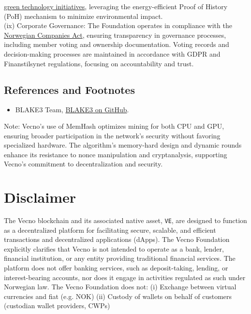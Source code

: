 \documentclass[a4paper,onecolumn,superscriptaddress,10pt]{compositionalityarticle}
\begin{document}
\href{https://www.regjeringen.no/en/aktuelt/a-greener-industrial-initiative-for-norway/id2996148/}{green technology initiatives}, leveraging the energy-efficient Proof of History (PoH) mechanism to minimize environmental impact.\\ (ix) Corporate Governance: The Foundation operates in compliance with the \href{https://lovdata.no/dokument/NLE/lov/2015-04-10-17/}{Norwegian Companies Act}, ensuring transparency in governance processes, including member voting and ownership documentation. Voting records and decision-making processes are maintained in accordance with GDPR and Finanstilsynet regulations, focusing on accountability and trust.

\subsection{References and Footnotes}\label{sec:subsec1}
\begin{itemize}
    \itemsep0em 
    \item BLAKE3 Team, \href{https://github.com/BLAKE3-team/BLAKE3}{BLAKE3 on GitHub}.
\end{itemize}

Note: Vecno’s use of MemHash optimizes mining for both CPU and GPU, ensuring broader participation in the network’s security without favoring specialized hardware. The algorithm’s memory-hard design and dynamic rounds enhance its resistance to nonce manipulation and cryptanalysis, supporting Vecno’s commitment to decentralization and security.
\vspace{1cm}

\newpage

\section{Disclaimer}The Vecno blockchain and its associated native asset, \texttt{VE}, are designed to function as a decentralized platform for facilitating secure, scalable, and efficient transactions and decentralized applications (dApps). The Vecno Foundation explicitly clarifies that Vecno is not intended to operate as a bank, lender, financial institution, or any entity providing traditional financial services. The platform does not offer banking services, such as deposit-taking, lending, or interest-bearing accounts, nor does it engage in activities regulated as such under Norwegian law. The Vecno Foundation does not: (i) Exchange between virtual currencies and fiat (e.g. NOK)
(ii) Custody of wallets on behalf of customers (custodian wallet providers, CWPs)
\end{document}
